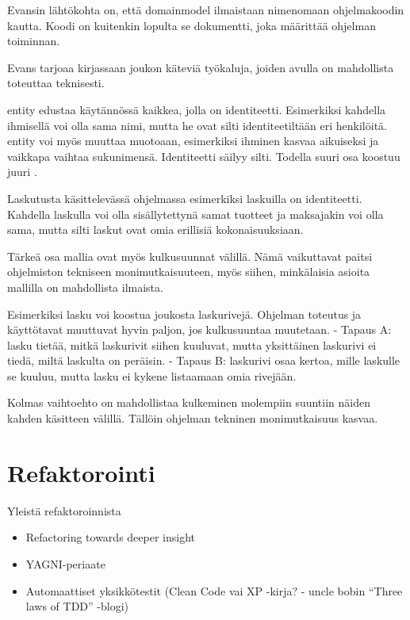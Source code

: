 Evansin lähtökohta on, että \gls{domainmodel} ilmaistaan nimenomaan
ohjelmakoodin kautta. Koodi on kuitenkin lopulta se dokumentti, joka
määrittää ohjelman toiminnan.

Evans tarjoaa kirjassaan joukon käteviä työkaluja, joiden avulla
 on mahdollista toteuttaa teknisesti.

\Gls{entity} edustaa käytännössä kaikkea, jolla on identiteetti.
Esimerkiksi kahdella ihmisellä voi olla sama nimi, mutta he ovat silti
identiteetiltään eri henkilöitä. \gls{entity} voi myös muuttaa muotoaan,
esimerkiksi ihminen kasvaa aikuiseksi ja vaikkapa vaihtaa sukunimensä.
Identiteetti säilyy silti. Todella suuri osa
 koostuu juuri
.

Laskutusta käsittelevässä ohjelmassa esimerkiksi laskuilla on
identiteetti. Kahdella laskulla voi olla sisällytettynä samat tuotteet
ja maksajakin voi olla sama, mutta silti laskut ovat omia erillisiä
kokonaisuuksiaan.

Tärkeä osa mallia ovat myös kulkusuunnat 
välillä. Nämä vaikuttavat paitsi ohjelmiston tekniseen
monimutkaisuuteen, myös siihen, minkälaisia asioita mallilla on
mahdollista ilmaista.

Esimerkiksi lasku voi koostua joukosta laskurivejä. Ohjelman toteutus ja
käyttötavat muuttuvat hyvin paljon, jos kulkusuuntaa muutetaan. - Tapaus
A: lasku tietää, mitkä laskurivit siihen kuuluvat, mutta yksittäinen
laskurivi ei tiedä, miltä laskulta on peräisin. - Tapaus B: laskurivi
osaa kertoa, mille laskulle se kuuluu, mutta lasku ei kykene listaamaan
omia rivejään.

Kolmas vaihtoehto on mahdollistaa kulkeminen molempiin suuntiin näiden
kahden käsitteen välillä. Tällöin ohjelman tekninen monimutkaisuus
kasvaa.

\hypertarget{refaktorointi}{%
\section{Refaktorointi}\label{refaktorointi}}

Yleistä refaktoroinnista

\begin{itemize}
\tightlist
\item
  Refactoring towards deeper insight
\item
  YAGNI-periaate
\item
  Automaattiset yksikkötestit (Clean Code vai XP -kirja? - uncle bobin
  ``Three laws of TDD'' -blogi)
\end{itemize}

